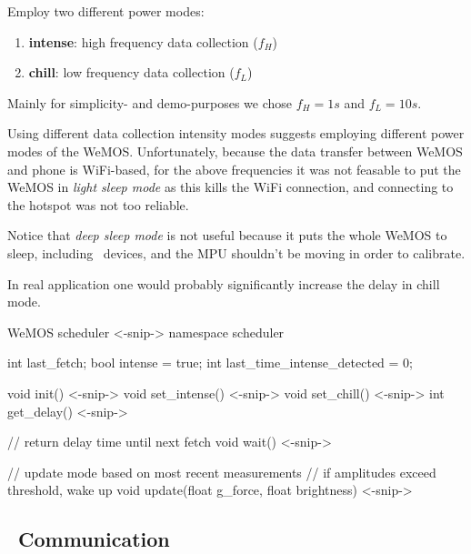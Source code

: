 \documentclass{article}
\begin{document}
\begin{multicols}{2}

\begin{_block}[]
Employ two different power modes:
\begin{enumerate}
    \item \textbf{intense}: high frequency data collection ($f_H$)
    \item \textbf{chill}: low frequency data collection ($f_L$)
\end{enumerate}
\end{_block}

Mainly for simplicity- and demo-purposes we chose $f_H=1s$ and $f_L=10s$.

Using different data collection intensity modes suggests employing different power modes of the WeMOS. Unfortunately, because the data transfer between WeMOS and phone is WiFi-based, for the above frequencies it was not feasable to put the WeMOS in \textit{light sleep mode} as this kills the WiFi connection, and connecting to the hotspot was not too reliable.

Notice that \textit{deep sleep mode} is not useful because it puts the whole WeMOS to sleep, including \ISquaredC\ devices, and the MPU shouldn't be moving in order to calibrate.

In real application one would probably significantly increase the delay in chill mode.

\begin{code}[c]{WeMOS scheduler}
<-snip->
namespace scheduler {
    int last_fetch;
    bool intense = true;
    int last_time_intense_detected = 0;
    
    void init() { <-snip-> }
    void set_intense(){ <-snip-> }
    void set_chill(){ <-snip-> }
    int get_delay(){ <-snip-> }

    // return delay time until next fetch
    void wait() { <-snip-> }
    
    // update mode based on most recent measurements
    // if amplitudes exceed threshold, wake up
    void update(float g_force, float brightness){ <-snip-> }
}
\end{code}

\end{multicols}

\subsection{\ISquaredC\ Communication}
\end{document}
